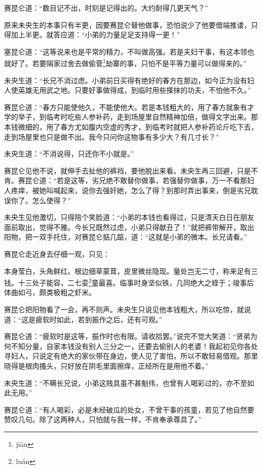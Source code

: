 \documentclass[a4paper,12pt,UTF8,twoside]{ctexbook}
\begin{document}
赛昆仑道：“数目记不出，时刻是记得出的。大约耐得几更天气？”

原来未央生的本事只有半更，因要赛昆仑替他做事，恐怕说少了他要借端推诿，只得加上半更。就答应道：“小弟的力量足足支持得一更！”

塞昆仑道：“这等说来也是平常的精力，不叫做高强。若是夫妇干事，有这本领也就好了。若要隔家过舍去做偷菅\footnote{ji\=an}劫寨的事，只怕不是平等力量可以做得来的。”

未央生道：“长兄不消过虑。小弟前日买得有绝好的春方在那边，如今正为没有妇人使英雄无用武之地。只要好事做得成，到临时用些搽抹的功夫，不怕他不久。”

赛昆仑道：“春方只能使他久，不能使他大。若是本钱粗大的，用了春方就象有才学的举子，到临考时吃些人参补药，走到场屋里自然精神加倍，做得文字出来。那本钱微细的，用了春方尤如腹内空虚的秀才，到临考时就把人参补药论斤吃下去，走到场屋里也只是做不出。我今只问你这物事有多少大？有几寸长？”

未央生道：“不消说得，只还你不小就是。”

赛昆仑见他不说，就伸手去扯他的裤裆，要他脱出来看。未央生再三回避，只是不肯。赛昆仑道：“若是这等，劣兄绝不敢替你做事，若强替你做事，万一不看那妇人疼痒，被她叫喊起来，说你去强奸她，怎么了得？到那时弄出事来，倒是劣兄耽误你了。怎么使得？”

未央生见他激切，只得陪个笑脸道：“小弟的本钱也看得过，只是清天白日在朋友面前取出，觉得不雅。今长兄既然过虑，小弟只得献丑了！”就把裤带解开，取出阳物，把一双手托住，对赛昆仑掂几踮，道：“这就是小弟的微本。长兄请看。”

赛昆仑走近身去仔细一观，只见：

本身莹白，头角鲜红。根边细草蒙茸，皮里微丝隐现。量处岂无二寸，称来足有三钱。十三处子能容，二七娈\footnote{lu\'an}童最喜。临事时身坚似铁，几同绝大之蛏于；竣事后体曲如弓，颇类极粗之虾米。

赛昆仑把阳物看了一会，再不则声。未央生只说见他本钱粗大，所以吃惊，就说道：“这是疲软时如此，若到振作之后，还有可观。”

赛昆仑道：“疲软时是这等，振作时也有限。请收拾罢。”说完不觉大笑道：“贤弟为何不知分量，自家本钱没有别人三分之一，还要去偷别人的老婆！我起初见你各处寻妇人，只说定有绝大的家伙带在身边，使人见了害怕，所以不敢轻易借观。那里晓得是根肉搔头，只好放在阴毛里面擦痒，正经所在是用他不着。”

未央生道：“不瞒长兄说，小弟这贱具虽不甚魁伟，也曾有人喝彩过的，亦不至如此无用。”

赛昆仑道：“有人喝彩，必是未经破瓜的处女，不曾干事的孩童，若见了他自然要赞叹几句。除了这两种人，只怕就与我一样，不肯奉承尊具了。”
\end{document}
